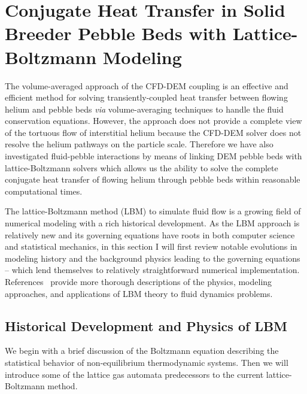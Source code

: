 
%
%
\chapter{Conjugate Heat Transfer in Solid Breeder Pebble Beds with Lattice-Boltzmann Modeling}\label{sec:modeling-lbm}
The volume-averaged approach of the CFD-DEM coupling is an effective and efficient method for solving transiently-coupled heat transfer between flowing helium and pebble beds \textit{via} volume-averaging techniques to handle the fluid conservation equations. However, the approach does not provide a complete view of the tortuous flow of interstitial helium because the CFD-DEM solver does not resolve the helium pathways on the particle scale. Therefore we have also investigated fluid-pebble interactions by means of linking DEM pebble beds with lattice-Boltzmann solvers which allows us the ability to solve the complete conjugate heat transfer of flowing helium through pebble beds within reasonable computational times.

The lattice-Boltzmann method (LBM) to simulate fluid flow is a growing field of numerical modeling with a rich historical development. As the LBM approach is relatively new and its governing equations have roots in both computer science and statistical mechanics, in this section I will first review notable evolutions in modeling history and the background physics leading to the governing equations -- which lend themselves to relatively straightforward numerical implementation. References~\cite{Chen1998a,Viggen2009,Sukop2007,Chopard2002,succi2001lattice} provide more thorough descriptions of the physics, modeling approaches, and applications of LBM theory to fluid dynamics problems.

\section{Historical Development and Physics of LBM}
We begin with a brief discussion of the Boltzmann equation describing the statistical behavior of non-equilibrium thermodynamic systems. Then we will introduce some of the lattice gas automata predecessors to the current lattice-Boltzmann method.

